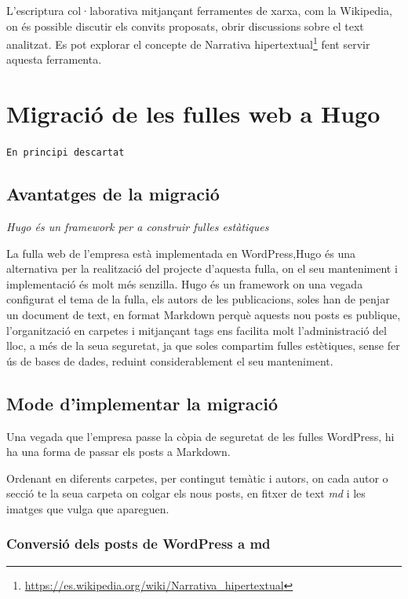 \documentclass[
  10pt,
]{krantz}
\DeclareRobustCommand{\href}[2]{#2\footnote{\url{#1}}}
\begin{document}
L'escriptura col·laborativa mitjançant ferramentes de xarxa, com la Wikipedia, on és possible discutir els convits proposats, obrir discussions sobre el text analitzat. Es pot explorar el concepte de \href{https://es.wikipedia.org/wiki/Narrativa_hipertextual}{Narrativa hipertextual} fent servir aquesta ferramenta.

\hypertarget{migraciuxf3-de-les-fulles-web-a-hugo}{%
\chapter{Migració de les fulles web a Hugo}\label{migraciuxf3-de-les-fulles-web-a-hugo}}

\texttt{En\ principi\ descartat}

\hypertarget{avantatges-de-la-migraciuxf3}{%
\section{Avantatges de la migració}\label{avantatges-de-la-migraciuxf3}}

\emph{Hugo és un framework per a construir fulles estàtiques}

La fulla web de l'empresa està implementada en WordPress,Hugo és una alternativa per la realització del projecte d'aquesta fulla, on el seu manteniment i implementació és molt més senzilla. Hugo és un framework on una vegada configurat el tema de la fulla, els autors de les publicacions, soles han de penjar un document de text, en format Markdown perquè aquests nou posts es publique, l'organització en carpetes i mitjançant tags ens facilita molt l'administració del lloc, a més de la seua seguretat, ja que soles compartim fulles estètiques, sense fer ús de bases de dades, reduint considerablement el seu manteniment.

\hypertarget{mode-dimplementar-la-migraciuxf3}{%
\section{Mode d'implementar la migració}\label{mode-dimplementar-la-migraciuxf3}}

Una vegada que l'empresa passe la còpia de seguretat de les fulles WordPress, hi ha una forma de passar els posts a Markdown.

Ordenant en diferents carpetes, per contingut temàtic i autors, on cada autor o secció te la seua carpeta on colgar els nous posts, en fitxer de text \emph{md} i les imatges que vulga que apareguen.

\hypertarget{conversiuxf3-dels-posts-de-wordpress-a-md}{%
\subsection{Conversió dels posts de WordPress a md}\label{conversiuxf3-dels-posts-de-wordpress-a-md}}
\end{document}

